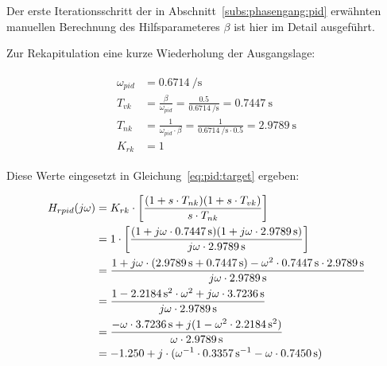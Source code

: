 Der   erste  Iterationsschritt   der  in   Abschnitt~\ref{subs:phasengang:pid}
erw\"ahnten  manuellen Berechnung  des  Hilfsparameteres $\beta$  ist hier  im
Detail ausgef\"uhrt.

Zur  Rekapitulation   eine  kurze   Wiederholung  der   Ausgangslage:

\begin{gather} \label{eq:app:recap}
    \begin{split}
        \omega_{pid} & = \SI{0.6714}{\per\second} \\
        {T_{vk}}     & = \frac{\beta}{\omega_{pid}}  = \frac{0.5}{\SI{0.6714}{\per\second}}                   = \SI{0.7447}{\second} \\
        {T_{nk}}     & = \frac{1}{\omega_{pid} \cdot \beta} = \frac{1}{\SI{0.6714}{\per\second} \cdot 0.5 }  = \SI{2.9789}{\second}  \\
        K_{rk}       & = 1
    \end{split}
\end{gather}

Diese Werte eingesetzt in Gleichung~\ref{eq:pid:target} ergeben:

\begin{gather} \label{eq:app:h_rpid:start}
    \begin{split}
        H_{rpid}(j\omega)
                 & = K_{rk} \cdot \biggl[ \frac{(1 + s       \cdot T_{nk}              ) (1 + s       \cdot T_{vk}              )}{ s       \cdot T_{nk} }              \biggr] \\
                 & =      1 \cdot \biggl[ \frac{(1 + j\omega \cdot \SI{0.7447}{\second}) (1 + j\omega \cdot \SI{2.9789}{\second})}{ j\omega \cdot \SI{2.9789}{\second}} \biggr] \\
                 & = \frac{%
                                1
                                +
                                j\omega
                                \cdot (
                                          \SI{2.9789}{\second}
                                          +
                                          \SI{0.7447}{\second}
                                      )
                                -
                                \omega^2
                                \cdot
                                \SI{0.7447}{\second}
                                \cdot
                                \SI{2.9789}{\second}
                           }{%
                                j\omega
                                \cdot
                                \SI{2.9789}{\second}
                           } \\
                 & = \frac{1 - \SI{2.2184}{\square\second} \cdot \omega^2 + j\omega \cdot \SI{3.7236}{\second}}{j\omega \cdot \SI{2.9789}{\second}} \\
                 & = \frac{-\omega \cdot \SI{3.7236}{\second} + j (1 - \omega^2 \cdot \SI{2.2184}{\square\second})}{\omega \cdot \SI{2.9789}{\second}} \\
                 & = -1.250 + j \cdot (\omega^{-1} \cdot \SI{0.3357}{\per\second} - \omega \cdot \SI{0.7450}{\second})
    \end{split}
\end{gather}

